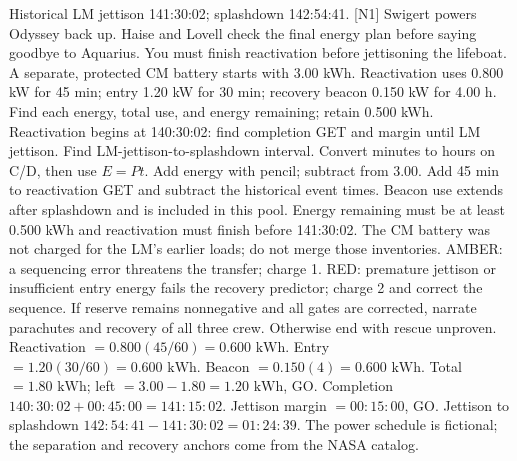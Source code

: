 {Historical LM jettison 141:30:02; splashdown 142:54:41. [N1]}
{Swigert powers Odyssey back up. Haise and Lovell check the final
energy plan before saying goodbye to Aquarius.
You must finish reactivation before jettisoning the lifeboat.}
{A separate, protected CM battery starts with 3.00 kWh.
Reactivation uses 0.800 kW for 45 min; entry 1.20 kW for 30 min;
recovery beacon 0.150 kW for 4.00 h.
Find each energy, total use, and energy remaining; retain 0.500 kWh.
Reactivation begins at 140:30:02: find completion GET and margin
until LM jettison. Find LM-jettison-to-splashdown interval.}
{Convert minutes to hours on C/D, then use \(E=Pt\).
Add energy with pencil; subtract from 3.00.
Add 45 min to reactivation GET and subtract the historical event times.
Beacon use extends after splashdown and is included in this pool.}
{Energy remaining must be at least 0.500 kWh and reactivation must
finish before 141:30:02. The CM battery was not charged for the
LM's earlier loads; do not merge those inventories.}
{AMBER: a sequencing error threatens the transfer; charge 1.
RED: premature jettison or insufficient entry energy fails the recovery
predictor; charge 2 and correct the sequence. If reserve remains
nonnegative and all gates are corrected, narrate parachutes and recovery
of all three crew. Otherwise end with rescue unproven.}
{Reactivation \(=0.800(45/60)=\boxed{0.600\text{ kWh}}\).
Entry \(=1.20(30/60)=\boxed{0.600\text{ kWh}}\).
Beacon \(=0.150(4)=\boxed{0.600\text{ kWh}}\).
Total \(=\boxed{1.80\text{ kWh}}\);
left \(=3.00-1.80=\boxed{1.20\text{ kWh}}\), GO.
Completion \(140{:}30{:}02+00{:}45{:}00
=\boxed{141{:}15{:}02}\).
Jettison margin \(=\boxed{00{:}15{:}00}\), GO.
Jettison to splashdown
\(142{:}54{:}41-141{:}30{:}02
=\boxed{01{:}24{:}39}\).
The power schedule is fictional; the separation and recovery anchors
come from the NASA catalog.}
